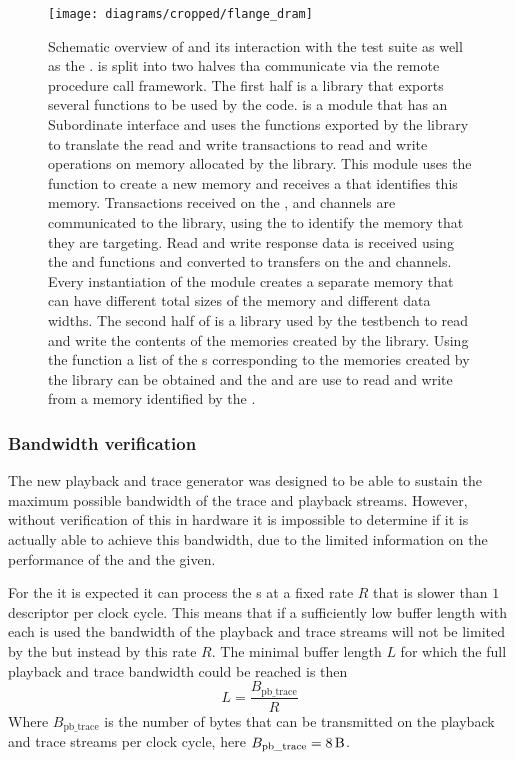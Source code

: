 \begin{figure}[htbp]
\centerline{\texttt{[image: diagrams/cropped/flange\_dram]}}
\caption{Schematic overview of \flangedram{} and its interaction with the \cpp{} test suite as well as the \systemverilog{} \DUT{}. \flangedram{} is split into two halves tha communicate via the \RCF{} remote procedure call framework. The first half is a \DPI{} library that exports several functions to be used by the \systemverilog{} code.  is a \systemverilog{} module that has an \AXI{} Subordinate interface and uses the functions exported by the \flangedram{} \DPI{} library to translate the \AXI{} read and write transactions to read and write operations on memory allocated by the \flangedram{} library. This module uses the  function to create a new memory and receives a  that identifies this memory. Transactions received on the \AW{}, \AR{} and \W{} \AXI{} channels are communicated to the \DPI{} library, using the  to identify the memory that they are targeting. Read and write response data is received using the  and  functions and converted to transfers on the \R{} and \B{} channels. Every instantiation of the  module creates a separate memory that can have different total sizes of the memory and different \AXI{} data widths.
The second half of \flangedram{} is a library used by the \cpp{} testbench to read and write the contents of the memories created by the \DPI{} library. Using the  function a list of the s corresponding to the memories created by the \DPI{} library can be obtained and the  and  are use to read and write from a memory identified by the .  }\label{dia:flange-dram-overview}
\end{figure}

\subsubsection{Bandwidth verification}\label{sec:pb_trace_verif}
The new playback and trace generator was designed to be able to sustain the maximum possible bandwidth of the trace and playback streams. However, without verification of this in hardware it is impossible to determine if it is actually able to achieve this bandwidth, due to the limited information on the performance of the \AXIDMA{} and the \XilinxMIG{} given.

For the \AXIDMA{} it is expected it can process the \descriptor{}s at a fixed rate $R$ that is slower than $1$ descriptor per clock cycle. This means that if a sufficiently low buffer length with each \descriptor{} is used the bandwidth of the playback and trace streams will not be limited by the \XilinxMIG{} but instead by this rate $R$.
The minimal buffer length $L$ for which the full playback and trace bandwidth could be reached is then
\[L = \frac{B_{\text{pb\_trace}}}{R}\]
Where $B_{\text{pb\_trace}}$ is the number of bytes that can be transmitted on the playback and trace streams per clock cycle, here $B_{\text{pb\_trace}} = \SI{8}{\byte}$.

